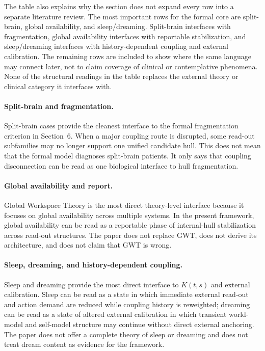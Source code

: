 \documentclass[12pt]{article}
\theoremstyle{definition}
\theoremstyle{remark}
\begin{document}
The table also explains why the section does not expand every row into a
separate literature review. The most important rows for the formal core
are split-brain, global availability, and sleep/dreaming. Split-brain
interfaces with fragmentation, global availability interfaces with
reportable stabilization, and sleep/dreaming interfaces with
history-dependent coupling and external calibration. The remaining rows
are included to show where the same language may connect later, not to
claim coverage of clinical or contemplative phenomena.
None of the structural readings in the table replaces the external
theory or clinical category it interfaces with.

\paragraph{Split-brain and fragmentation.}
Split-brain cases provide the cleanest interface to the formal
fragmentation criterion in Section~6. When a major coupling route is
disrupted, some read-out subfamilies may no longer support one unified
candidate hull. This does not mean that the formal model diagnoses
split-brain patients. It only says that coupling disconnection can be
read as one biological interface to hull fragmentation.

\paragraph{Global availability and report.}
Global Workspace Theory is the most direct theory-level interface
because it focuses on global availability across multiple systems. In
the present framework, global availability can be read as a reportable
phase of internal-hull stabilization across read-out structures. The
paper does not replace GWT, does not derive its architecture, and does
not claim that GWT is wrong.

\paragraph{Sleep, dreaming, and history-dependent coupling.}
Sleep and dreaming provide the most direct interface to \(K(t,s)\) and
external calibration. Sleep can be read as a state in which immediate
external read-out and action demand are reduced while coupling history
is reweighted; dreaming can be read as a state of altered external
calibration in which transient world-model and self-model structure may
continue without direct external anchoring. The paper does not offer a
complete theory of sleep or dreaming and does not treat dream content as
evidence for the framework.
\end{document}
